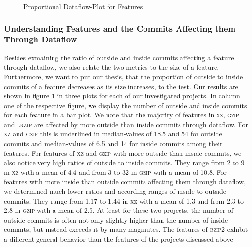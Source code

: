 \clearpage

\begin{figure}[htbp]
  \centering
  
  \caption{Proportional Dataflow-Plot for Features}
  \label{fig:feature_dfbr_plot}
\end{figure}

\clearpage

\subsubsection*{Understanding Features and the Commits Affecting them Through Dataflow}\label{sec:eval_feature_dfbr}

Besides exmaining the ratio of outside and inside commits affecting a feature through dataflow, we also relate the two metrics to the size of a feature.
Furthermore, we want to put our thesis, that the proportion of outside to inside commits of a feature decreases as its size increases, to the test.
Our results are shown in figure \ref{fig:feature_dfbr_plot} in three plots for each of our investigated projects.
In column one of the respective figure, we display the number of outside and inside commits for each feature in a bar plot.
We note that the majority of features in \textsc{xz}, \textsc{gzip} and \textsc{lrzip} are affected by more outside than inside commits through dataflow.
For \textsc{xz} and \textsc{gzip} this is underlined in median-values of 18.5 and 54 for outside commits and median-values of 6.5 and 14 for inside commits among their features.
For features of \textsc{xz} and \textsc{gzip} with more outside than inside commits, we also notice very high ratios of outside to inside commits.
They range from 2 to 9 in \textsc{xz} with a mean of 4.4 and from 3 to 32 in \textsc{gzip} with a mean of 10.8.
For features with more inside than outside commits affecting them through dataflow, we determined much lower ratios and according ranges of inside to outside commits.
They range from 1.17 to 1.44 in \textsc{xz} with a mean of 1.3 and from 2.3 to 2.8 in \textsc{gzip} with a mean of 2.5.
At least for these two projects, the number of outside commits is often not only slightly higher than the number of inside commits, but instead exceeds it by many maginutes.
The features of \textsc{bzip2} exhibit a different general behavior than the features of the projects discussed above.
